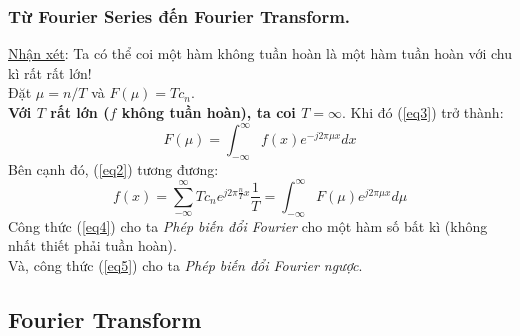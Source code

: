 \documentclass{article}
\begin{document}
        \subsubsection{Từ Fourier Series đến Fourier Transform.}
        \label{n1}
        \underline{Nhận xét}: Ta có thể coi một hàm không tuần hoàn là một hàm tuần hoàn với chu kì rất rất lớn!\\
        Đặt $\mu = n/T$ và $F(\mu) = T c_n$. \\
        \textbf{Với $T$ rất lớn ($f$ không tuần hoàn), ta coi $T = \infty$}. Khi đó (\ref{eq3}) trở thành:
        \begin{equation}
            F(\mu) = \int_{-\infty}^{\infty} f(x) e^{-j2\pi \mu x} dx
            \label{eq4}
        \end{equation}
        Bên cạnh đó, (\ref{eq2}) tương đương:
        \begin{equation}
            f(x) = \sum_{-\infty}^{\infty} Tc_n e^{j2\pi \frac{n}{T} x} \frac{1}{T} = \int_{-\infty}^{\infty} F(\mu) e^{j2\pi \mu x} d\mu
            \label{eq5}
        \end{equation}
        Công thức (\ref{eq4}) cho ta \textit{Phép biến đổi Fourier} cho một hàm số bất kì (không nhất thiết phải tuần hoàn).\\
        Và, công thức (\ref{eq5}) cho ta \textit{Phép biến đổi Fourier ngược}.
        \subsection{Fourier Transform}
\end{document}

